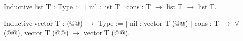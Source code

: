 Inductive list T : Type :=
| nil : list T
| cons : T $\rightarrow$
    list T $\rightarrow$
    list T.

Inductive vector T : (@@) $\rightarrow$ Type :=
| nil : vector T (@@)
| cons : T $\rightarrow$ $\forall$ (@@),
    vector T (@@) $\rightarrow$
    vector T (@@).
